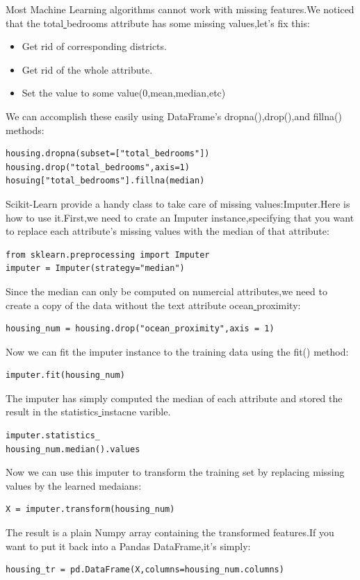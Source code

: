 \documentclass[UTF8]{ctexart}
\begin{document}
Most Machine Learning algorithms cannot work with missing features.We noticed that the total\underline{ }bedrooms attribute has some missing values,let's fix this:

\begin{itemize}
	\item Get rid of corresponding districts.
	\item Get rid of the whole attribute.
	\item Set the value to some value(0,mean,median,etc) 
\end{itemize}

We can accomplish these easily using DataFrame's dropna(),drop(),and fillna() methods:

\begin{lstlisting}
housing.dropna(subset=["total_bedrooms"])
housing.drop("total_bedrooms",axis=1)
hosuing["total_bedrooms"].fillna(median)
\end{lstlisting}

Scikit-Learn provide a handy class to take care of missing values:Imputer.Here is how to use it.First,we need to crate an Imputer instance,specifying that you want to replace each attribute's missing values with the median of that attribute:
\begin{lstlisting}
from sklearn.preprocessing import Imputer
imputer = Imputer(strategy="median")
\end{lstlisting}

Since the median can only be computed on numercial attributes,we need to create a copy of the data without the text attribute ocean\underline{ }proximity:

\begin{lstlisting}
housing_num = housing.drop("ocean_proximity",axis = 1)
\end{lstlisting}
Now we can fit the imputer instance to the training data using the fit() method:
\begin{lstlisting}
imputer.fit(housing_num)
\end{lstlisting}
The imputer has simply computed the median of each attribute and stored the result in the statistics\underline{ } instacne varible.
\begin{lstlisting}
imputer.statistics_
housing_num.median().values
\end{lstlisting}

Now we can use this imputer to transform the training set by replacing missing values by the learned medaians:
\begin{lstlisting}
X = imputer.transform(housing_num)
\end{lstlisting}
The result is a plain Numpy array containing the transformed features.If you want to put it back into a Pandas DataFrame,it's simply:
\begin{lstlisting}
housing_tr = pd.DataFrame(X,columns=housing_num.columns)
\end{lstlisting}
\end{document}
